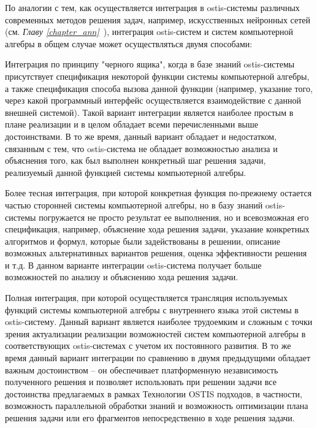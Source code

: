 По аналогии с тем, как осуществляется интеграция в ostis-системы различных современных методов решения задач, например, искусственных нейронных сетей (см. \textit{Главу \ref{chapter_ann}~}), интеграция ostis-систем и систем компьютерной алгебры в общем случае может осуществляться двумя способами:
\begin{textitemize}
	\item Интеграция по принципу "черного ящика"{}, когда в базе знаний ostis-системы присутствует спецификация некоторой функции системы компьютерной алгебры, а также спецификация способа вызова данной функции (например, указание того, через какой программный интерфейс осуществляется взаимодействие с данной внешней системой). Такой вариант интеграции является наиболее простым в плане реализации и в целом обладает всеми перечисленными выше достоинствами. В то же время, данный вариант обладает и недостатком, связанным с тем, что ostis-система не обладает возможностью анализа и объяснения того, как был выполнен конкретный шаг решения задачи, реализуемый данной функцией системы компьютерной алгебры.
	\item Более тесная интеграция, при которой конкретная функция по-прежнему остается частью сторонней системы компьютерной алгебры, но в базу знаний ostis-системы погружается не просто результат ее выполнения, но и всевозможная его спецификация, например, объяснение хода решения задачи, указание конкретных алгоритмов и формул, которые были задействованы в решении, описание возможных альтернативных вариантов решения, оценка эффективности решения и т.д. В данном варианте интеграции ostis-система получает больше возможностей по анализу и объяснению хода решения задачи.
	\item Полная интеграция, при которой осуществляется трансляция используемых функций системы компьютерной алгебры с внутреннего языка этой системы в ostis-систему. Данный вариант является наиболее трудоемким и сложным с точки зрения актуализации реализации возможностей систем компьютерной алгебры в соответствующих ostis-системах с учетом их постоянного развития. В то же время данный вариант интеграции по сравнению в двумя предыдущими обладает важным достоинством -- он обеспечивает платформенную независимость полученного решения и позволяет использовать при решении задачи все достоинства предлагаемых в рамках Технологии OSTIS подходов, в частности, возможность параллельной обработки знаний и возможность оптимизации плана решения задачи или его фрагментов непосредственно в ходе решения задачи.
\end{textitemize}


